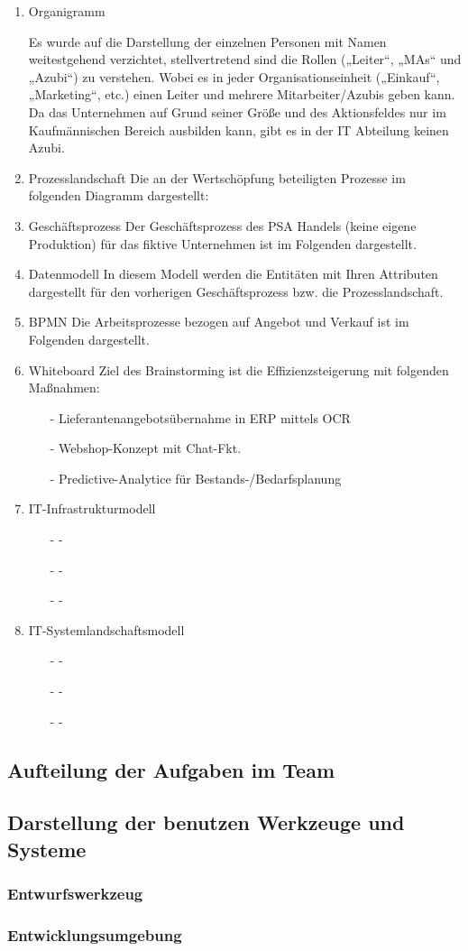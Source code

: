 \begin{enumerate}
\item Organigramm

Es wurde auf die Darstellung der einzelnen Personen mit Namen weitestgehend verzichtet, stellvertretend sind die Rollen („Leiter“, „MAs“ und „Azubi“) zu verstehen. Wobei es in jeder Organisationseinheit („Einkauf“, „Marketing“, etc.) einen Leiter und mehrere Mitarbeiter/Azubis geben kann. Da das Unternehmen auf Grund seiner Größe und des Aktionsfeldes nur im Kaufmännischen Bereich ausbilden kann, gibt es in der IT Abteilung keinen Azubi.

\item Prozesslandschaft
Die an der Wertschöpfung beteiligten Prozesse im folgenden Diagramm dargestellt: 

\item Geschäftsprozess
Der Geschäftsprozess des PSA Handels (keine eigene Produktion) für das fiktive Unternehmen ist im Folgenden dargestellt.

\item Datenmodell
In diesem Modell werden die Entitäten mit Ihren Attributen dargestellt für den vorherigen Geschäftsprozess bzw. die Prozesslandschaft.

\item BPMN
Die Arbeitsprozesse bezogen auf Angebot und Verkauf ist im Folgenden dargestellt. 

\item Whiteboard
Ziel des Brainstorming ist die Effizienzsteigerung mit folgenden Maßnahmen:
\begin{itemize}
	\item[-] Lieferantenangebotsübernahme in ERP mittels OCR
	\item[-] Webshop-Konzept mit Chat-Fkt.
	\item[-] Predictive-Analytice für Bestands-/Bedarfsplanung
\end{itemize}

\item IT-Infrastrukturmodell
\begin{itemize}
	\item[-] -
	\item[-] -
	\item[-] -
\end{itemize}
\item IT-Systemlandschaftsmodell
\begin{itemize}
	\item[-] -
	\item[-] -
	\item[-] -
\end{itemize}
\end{enumerate}
\subsection*{Aufteilung der Aufgaben im Team}
\subsection*{Darstellung der benutzen Werkzeuge und Systeme}
\subsubsection*{Entwurfswerkzeug}
\subsubsection*{Entwicklungsumgebung}

